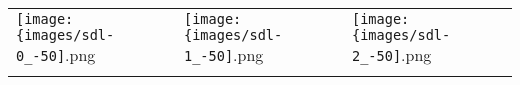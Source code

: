  \begin{tabular}{lll}
\texttt{[image: \{images/sdl-0\_-50]}.png} &\texttt{[image: \{images/sdl-1\_-50]}.png} &\texttt{[image: \{images/sdl-2\_-50]}.png} 
 \\ \hfill\end{tabular}